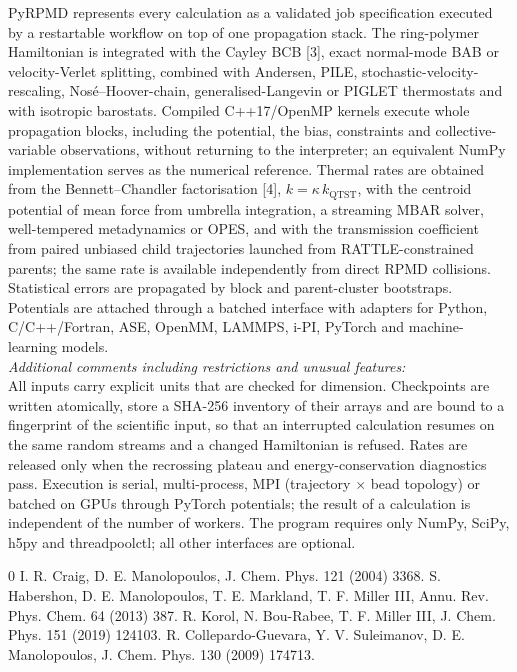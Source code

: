 \documentclass[preprint,12pt]{elsarticle}
\begin{document}
\begin{small}
PyRPMD represents every calculation as a validated job specification executed by a restartable workflow on top of one propagation stack. The ring-polymer Hamiltonian is integrated with the Cayley BCB [3], exact normal-mode BAB or velocity-Verlet splitting, combined with Andersen, PILE, stochastic-velocity-rescaling, Nos\'e--Hoover-chain, generalised-Langevin or PIGLET thermostats and with isotropic barostats. Compiled C++17/OpenMP kernels execute whole propagation blocks, including the potential, the bias, constraints and collective-variable observations, without returning to the interpreter; an equivalent NumPy implementation serves as the numerical reference. Thermal rates are obtained from the Bennett--Chandler factorisation [4], $k=\kappa\,k_{\mathrm{QTST}}$, with the centroid potential of mean force from umbrella integration, a streaming MBAR solver, well-tempered metadynamics or OPES, and with the transmission coefficient from paired unbiased child trajectories launched from RATTLE-constrained parents; the same rate is available independently from direct RPMD collisions. Statistical errors are propagated by block and parent-cluster bootstraps. Potentials are attached through a batched interface with adapters for Python, C/C++/Fortran, ASE, OpenMM, LAMMPS, i-PI, PyTorch and machine-learning models. \\
{\em Additional comments including restrictions and unusual features:}\\
All inputs carry explicit units that are checked for dimension. Checkpoints are written atomically, store a SHA-256 inventory of their arrays and are bound to a fingerprint of the scientific input, so that an interrupted calculation resumes on the same random streams and a changed Hamiltonian is refused. Rates are released only when the recrossing plateau and energy-conservation diagnostics pass. Execution is serial, multi-process, MPI (trajectory $\times$ bead topology) or batched on GPUs through PyTorch potentials; the result of a calculation is independent of the number of workers. The program requires only NumPy, SciPy, h5py and threadpoolctl; all other interfaces are optional.

\begin{thebibliography}{0}
 I. R. Craig, D. E. Manolopoulos, J. Chem. Phys. 121 (2004) 3368.
 S. Habershon, D. E. Manolopoulos, T. E. Markland, T. F. Miller III, Annu. Rev. Phys. Chem. 64 (2013) 387.
 R. Korol, N. Bou-Rabee, T. F. Miller III, J. Chem. Phys. 151 (2019) 124103.
 R. Collepardo-Guevara, Y. V. Suleimanov, D. E. Manolopoulos, J. Chem. Phys. 130 (2009) 174713.
\end{thebibliography}
\end{small}
\end{document}
